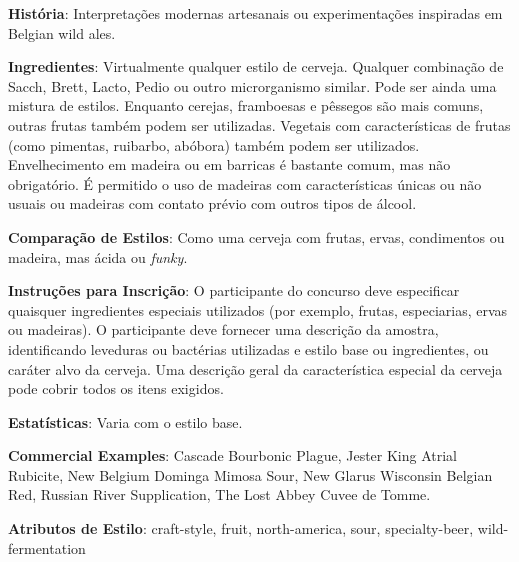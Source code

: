 \textbf{História}: Interpretações modernas artesanais ou experimentações inspiradas em Belgian wild ales.

\textbf{Ingredientes}: Virtualmente qualquer estilo de cerveja. Qualquer combinação de Sacch, Brett, Lacto, Pedio ou outro microrganismo similar. Pode ser ainda uma mistura de estilos. Enquanto cerejas, framboesas e pêssegos são mais comuns, outras frutas também podem ser utilizadas. Vegetais com características de frutas (como pimentas, ruibarbo, abóbora) também podem ser utilizados. Envelhecimento em madeira ou em barricas é bastante comum, mas não obrigatório. É permitido o uso de madeiras com características únicas ou não usuais ou madeiras com contato prévio com outros tipos de álcool.

\textbf{Comparação de Estilos}: Como uma cerveja com frutas, ervas, condimentos ou madeira, mas ácida ou \textit{funky}.

\textbf{Instruções para Inscrição}: O participante do concurso deve especificar quaisquer ingredientes especiais utilizados (por exemplo, frutas, especiarias, ervas ou madeiras). O participante deve fornecer uma descrição da amostra, identificando leveduras ou bactérias utilizadas e estilo base ou ingredientes, ou caráter alvo da cerveja. Uma descrição geral da característica especial da cerveja pode cobrir todos os itens exigidos.

\textbf{Estatísticas}: Varia com o estilo base.

\textbf{Commercial Examples}: Cascade Bourbonic Plague, Jester King Atrial Rubicite, New Belgium Dominga Mimosa Sour, New Glarus Wisconsin Belgian Red, Russian River Supplication, The Lost Abbey Cuvee de Tomme.

\textbf{Atributos de Estilo}: craft-style, fruit, north-america, sour, specialty-beer, wild-fermentation
